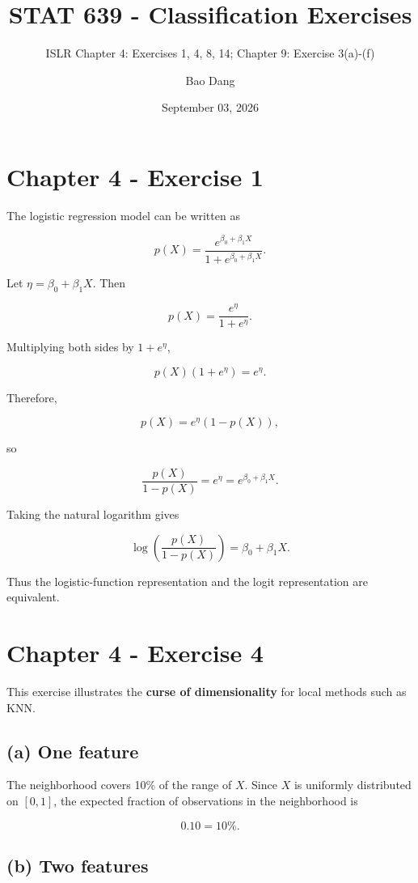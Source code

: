 \documentclass[
]{article}
\title{STAT 639 - Classification Exercises}
\subtitle{ISLR Chapter 4: Exercises 1, 4, 8, 14; Chapter 9: Exercise
3(a)-(f)}
\author{Bao Dang}
\date{September 03, 2026}
\begin{document}
\maketitle

{
\setcounter{tocdepth}{3}
\tableofcontents
}
\newpage

\section{Chapter 4 - Exercise 1}\label{chapter-4---exercise-1}

The logistic regression model can be written as

\[
p(X)=\frac{e^{\beta_0+\beta_1X}}{1+e^{\beta_0+\beta_1X}}.
\]

Let \(\eta=\beta_0+\beta_1X\). Then

\[
p(X)=\frac{e^\eta}{1+e^\eta}.
\]

Multiplying both sides by \(1+e^\eta\),

\[
p(X)(1+e^\eta)=e^\eta.
\]

Therefore,

\[
p(X)=e^\eta(1-p(X)),
\]

so

\[
\frac{p(X)}{1-p(X)}=e^\eta=e^{\beta_0+\beta_1X}.
\]

Taking the natural logarithm gives

\[
\log\left(\frac{p(X)}{1-p(X)}\right)=\beta_0+\beta_1X.
\]

Thus the logistic-function representation and the logit representation
are equivalent.

\section{Chapter 4 - Exercise 4}\label{chapter-4---exercise-4}

This exercise illustrates the \textbf{curse of dimensionality} for local
methods such as KNN.

\subsection{(a) One feature}\label{a-one-feature}

The neighborhood covers 10\% of the range of \(X\). Since \(X\) is
uniformly distributed on \([0,1]\), the expected fraction of
observations in the neighborhood is

\[
0.10 = 10\%.
\]

\subsection{(b) Two features}\label{b-two-features}
\end{document}
